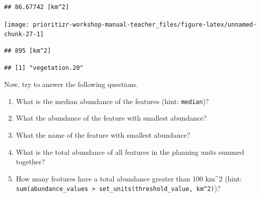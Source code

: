 \documentclass[12pt,]{book}
\newenvironment{Shaded}{\begin{snugshade}}{\end{snugshade}}
\newcommand{\KeywordTok}[1]{\textcolor[rgb]{0.13,0.29,0.53}{\textbf{#1}}}
\newcommand{\DataTypeTok}[1]{\textcolor[rgb]{0.13,0.29,0.53}{#1}}
\newcommand{\StringTok}[1]{\textcolor[rgb]{0.31,0.60,0.02}{#1}}
\newcommand{\CommentTok}[1]{\textcolor[rgb]{0.56,0.35,0.01}{\textit{#1}}}
\newcommand{\OperatorTok}[1]{\textcolor[rgb]{0.81,0.36,0.00}{\textbf{#1}}}
\newcommand{\NormalTok}[1]{#1}
\providecommand{\tightlist}{%
  \setlength{\itemsep}{0pt}\setlength{\parskip}{0pt}}
\let\BeginKnitrBlock\begin \let\EndKnitrBlock\end
\begin{document}
\begin{verbatim}
## 86.67742 [km^2]
\end{verbatim}

\begin{Shaded}
\end{Shaded}

\begin{center}\texttt{[image: prioritizr-workshop-manual-teacher\_files/figure-latex/unnamed-chunk-27-1]} \end{center}

\begin{Shaded}
\end{Shaded}

\begin{verbatim}
## 895 [km^2]
\end{verbatim}

\begin{Shaded}
\end{Shaded}

\begin{verbatim}
## [1] "vegetation.20"
\end{verbatim}

Now, try to answer the following questions.

\BeginKnitrBlock{rmdquestion}
\begin{enumerate}
\def\labelenumi{\arabic{enumi}.}
\tightlist
\item
  What is the median abundance of the features (hint: \texttt{median})?
\item
  What the abundance of the feature with smallest abundance?
\item
  What the name of the feature with smallest abundance?
\item
  What is the total abundance of all features in the planning units
  summed together?
\item
  How many features have a total abundance greater than 100 km\^{}2
  (hint:
  \texttt{sum(abundance\_values\ \textgreater{}\ set\_units(threshold\_value,\ km\^{}2)})?
\end{enumerate}
\EndKnitrBlock{rmdquestion}
\end{document}
